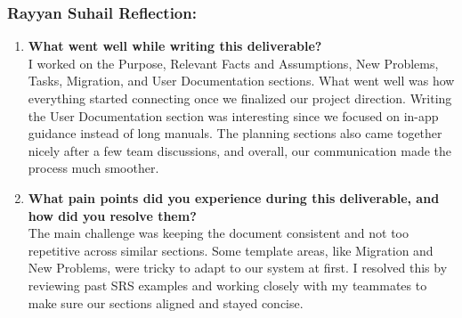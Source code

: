\subsubsection*{Rayyan Suhail Reflection:}
\begin{enumerate}
  \item \textbf{What went well while writing this deliverable?} \\
  I worked on the Purpose, Relevant Facts and Assumptions, New Problems, Tasks, Migration, and User Documentation sections. What went well was how everything started connecting once we finalized our project direction. Writing the User Documentation section was interesting since we focused on in-app guidance instead of long manuals. The planning sections also came together nicely after a few team discussions, and overall, our communication made the process much smoother.

  \item \textbf{What pain points did you experience during this deliverable, and how did you resolve them?} \\
  The main challenge was keeping the document consistent and not too repetitive across similar sections. Some template areas, like Migration and New Problems, were tricky to adapt to our system at first. I resolved this by reviewing past SRS examples and working closely with my teammates to make sure our sections aligned and stayed concise.
\end{enumerate}

